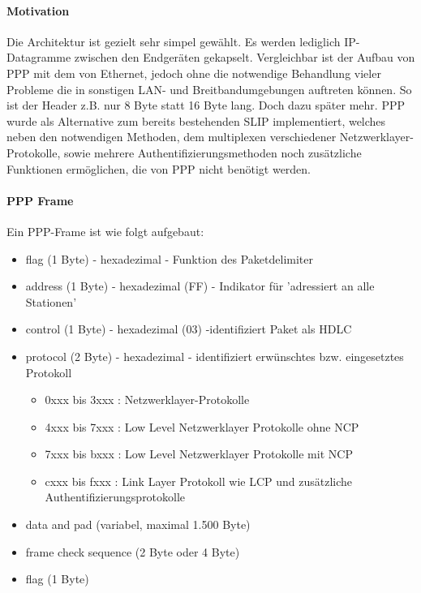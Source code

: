 
\paragraph{Motivation} Die Architektur ist gezielt sehr simpel gewählt. Es werden lediglich IP-Datagramme zwischen den
Endgeräten gekapselt. Vergleichbar ist der Aufbau von PPP mit dem von Ethernet, jedoch ohne
die notwendige Behandlung vieler Probleme die in sonstigen \ac{LAN}- und Breitbandumgebungen
auftreten können. So ist der Header z.B. nur 8 Byte statt 16 Byte lang. Doch dazu später mehr.
\ac{PPP} wurde als Alternative zum bereits bestehenden \ac{SLIP} implementiert, welches neben den notwendigen
Methoden, dem multiplexen verschiedener Netzwerklayer-Protokolle, sowie mehrere Authentifizierungsmethoden noch zusätzliche Funktionen ermöglichen, die von PPP nicht benötigt werden.

\paragraph{PPP Frame}
Ein \ac{PPP}-Frame ist wie folgt aufgebaut:

\begin{itemize}
\item flag (1 Byte) - hexadezimal - Funktion des Paketdelimiter
\item address (1 Byte) - hexadezimal (FF) - Indikator für 'adressiert an alle Stationen'
\item control (1 Byte) - hexadezimal (03) -identifiziert Paket als \ac{HDLC}
\item protocol (2 Byte) - hexadezimal - identifiziert erwünschtes bzw. eingesetztes Protokoll
	\begin{itemize}
		\item 0xxx bis 3xxx : Netzwerklayer-Protokolle
		\item 4xxx bis 7xxx : Low Level Netzwerklayer Protokolle ohne \ac{NCP}
		\item 7xxx bis bxxx : Low Level Netzwerklayer Protokolle mit \ac{NCP}
		\item cxxx bis fxxx : Link Layer Protokoll wie LCP und zusätzliche Authentifizierungsprotokolle
	\end{itemize}
\item data and pad (variabel, maximal 1.500 Byte)
\item frame check sequence (2 Byte oder 4 Byte)
\item flag (1 Byte)
\end{itemize}

